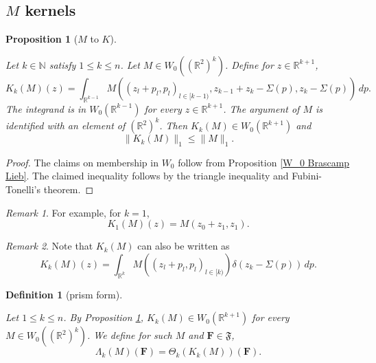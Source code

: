 \documentclass[12pt,reqno]{amsart}
\theoremstyle{plain}
\newtheorem{proposition}[theorem]{Proposition}
\newtheorem{definition}[theorem]{Definition}
\numberwithin{equation}{section}
\theoremstyle{remark}
\newtheorem{rem}{Remark}[section]
\newcommand{\uses}[1]{}
\newcommand{\usesdefs}[1]{}
\newcommand{\leanok}{}
\newcommand{\lean}[1]{}
\newcommand{\R}{{\mathbb R}}
\newcommand{\N}{{\mathbb N}}
\begin{document}
\subsection{\texorpdfstring{$M$}{M} kernels}

\begin{proposition}[$M$ to $K$]\label{M to K}\uses{W_0 Brascamp Lieb}\usesdefs{auto:Wiener-space-definition}
\lean{Auto.mToK,Auto.mToK_integrand_memW0,Auto.mToK_memW0,Auto.mToK_eLpNorm_one_le}
\leanok
Let $k\in\N$ satisfy $1\le k\le n$. Let $M\in W_0((\R^2)^k)$.
Define for $z\in \R^{k+1}$,
\begin{equation}\label{kviam_2}
    K_k(M)(z)=\int_{\R^{k-1}}  M((z_{l}+p_{l},p_{l})_{l\in [k-1)}, z_{k-1}+z_{k}-\Sigma(p),z_{k}-\Sigma(p))\,dp.
\end{equation}
The integrand is in $W_0(\R^{k-1})$ for every $z\in\R^{k+1}$.
The argument of $M$ is identified with an element of $(\R^2)^{k}$.
Then $K_k(M)\in W_0(\R^{k+1})$ and
\begin{equation}\label{auto:K-map-L1-bound} \|K_k(M)\|_1 \le \|M\|_1. \end{equation}
\end{proposition}

\begin{proof}
The claims on membership in $W_0$ follow from
Proposition \ref{W_0 Brascamp Lieb}.
The claimed inequality follows by the triangle inequality and Fubini-Tonelli's theorem.
\end{proof}

\begin{rem}
For example, for $k=1$,
\begin{equation}\label{auto:K-one-explicit-formula}K_1(M)(z)=M(z_0+z_1,z_1).\end{equation}
\end{rem}

\begin{rem}
Note that $K_k(M)$ can also be written as
\begin{equation}\label{kviam_2'}
    K_k(M)(z)=\int_{\R^{k}}  M((z_{l}+p_{l},p_{l})_{l\in[k)}) \delta( z_{k}-\Sigma(p))\,dp.
\end{equation}
\end{rem}

\begin{definition}[prism form]\label{auto:prism-form-definition}\uses{M to K}\usesdefs{auto:Wiener-space-definition,normalized function tuples,prism Brascamp--Lieb}
\lean{Auto.prismForm}
Let $1\le k\le n$. By Proposition \ref{M to K}, $K_k(M)\in W_0(\R^{k+1})$ for every $M\in W_0((\R^2)^k)$. We define for such $M$ and $\mathbf{F}\in\mathfrak{F}$,
\begin{equation}\label{auto:prism-form-formula}\Lambda_k(M)(\mathbf{F}) = \Theta_k(K_k(M))(\mathbf{F}).\end{equation}
\end{definition}
\end{document}
